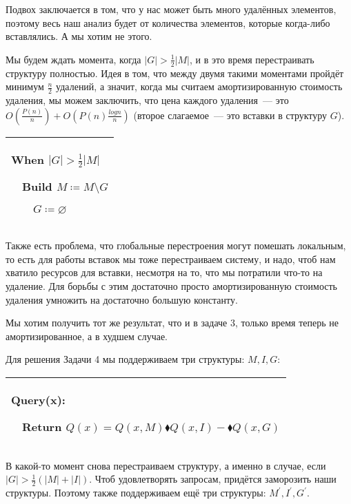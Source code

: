 Подвох заключается в том, что у нас может быть много удалённых элементов, поэтому весь наш анализ будет от количества элементов, которые когда-либо вставлялись. А мы хотим не этого.

Мы будем ждать момента, когда $|G| > \frac{1}{2}|M|$, и в это время перестраивать структуру полностью. Идея в том, что между двумя такими моментами пройдёт минимум $\frac{n}{2}$ удалений, а значит, когда мы считаем амортизированную стоимость удаления, мы можем заключить, что цена каждого удаления~--- это
$O\left(\frac{P(n)}{n}\right) + O\left(P(n)\frac{log n}{n}\right)$ (второе слагаемое~--- это вставки в структуру $G$).


\begin{tabular}{|p{5cm}|}
	\hline

	When $|G| > \frac{1}{2}|M|$

	$\quad$Build $M \coloneqq M\setminus G$

	$\quad$$\quad$$G \coloneqq \varnothing$ \\

	\hline
\end{tabular}

Также есть проблема, что глобальные перестроения могут помешать локальным, то есть для работы вставок мы тоже перестраиваем систему, и надо, чтоб нам хватило ресурсов для вставки, несмотря на то, что мы потратили что-то на удаление. Для борьбы с этим достаточно просто амортизированную стоимость удаления умножить на достаточно большую константу.



\begin{task}
	Мы хотим получить тот же результат, что и в задаче 3, только время теперь не амортизированное, а в худшем случае.
\end{task}

Для решения Задачи 4 мы поддерживаем три структуры: $M,I,G$:


\begin{tabular}{|p{8cm}|}
	\hline
	Query(x):

	$\quad$Return $Q(x) = Q(x,M)\blacklozenge Q(x,I) - \blacklozenge Q(x,G)$ \\
	\hline
\end{tabular}


В какой-то момент снова перестраиваем структуру, а именно в случае, если $|G| > \frac{1}{2}(|M| + |I|)$. Чтоб удовлетворять запросам, придётся заморозить наши структуры. Поэтому также поддерживаем ещё три структуры: $M^\prime,I^\prime,G^\prime$.

